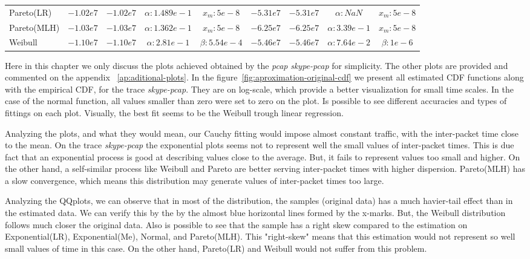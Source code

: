 \begin{table}[h!]
{\begin{tabular}{lcccccccc}
            Pareto(LR)      & $-1.02e7$   & $-1.02e7$  & $\alpha:1.489e-1 $ & $x_m:5e-8 $    
            & $-5.31e7$   & $-5.31e7$  & $\alpha:NaN$ & $x_m:5e-8 $    \\
            Pareto(MLH)     & $-1.03e7$   & $-1.03e7$  & $\alpha:1.362e-1$ & $x_m:5e-8 $    
            & $-6.25e7$   & $-6.25e7$  & $\alpha:3.39e-1$ & $x_m:5e-8 $    \\
            Weibull         & $-1.10e7$   & $-1.10e7$  & $\alpha:2.81e-1$ & $\beta:5.54e-4$  
            & $-5.46e7$   & $-5.46e7$  & $\alpha:7.64e-2$ & $\beta:1e-6$  \\ \hline
        \end{tabular}
    \label{tab:prototype-results}
    }
\end{table}

Here in this chapter we only discuss the plots achieved obtained by the \textit{pcap} \textit{skype-pcap} for simplicity. The other plots are provided and commented on the appendix ~\ref{ap:aditional-plots}. In the figure~\ref{fig:aproximation-original-cdf} we present all estimated CDF functions along with the empirical CDF, for the trace \textit{skype-pcap}. They are on log-scale, which provide a better visualization for small time scales. In the case of the normal function, all values smaller than zero were set to zero on the plot. Is possible to see different accuracies and types of fittings on each plot. Visually, the best fit seems to be the Weibull trough linear regression. 

Analyzing the plots, and what they would mean, our Cauchy fitting would impose almost constant traffic, with the inter-packet time close to the mean. On the trace \textit{skype-pcap} the exponential plots seems not to represent well the small values of inter-packet times. This is due fact that an exponential process is good at describing values close to the average. But, it fails to represent values too small and higher. On the other hand, a self-similar process like Weibull and Pareto are better serving inter-packet times with higher dispersion. Pareto(MLH) has a slow convergence, which means this distribution may generate values of inter-packet times too large. 

Analyzing the QQplots, we can observe that in most of the distribution, the samples (original data) has a much havier-tail effect than in the estimated data. We can verify this by the by the almost blue horizontal lines formed by the x-marks. But, the Weibull distribution follows much closer the original data. Also is possible to see that the sample has a right skew compared to the estimation on Exponential(LR), Exponential(Me), Normal, and Pareto(MLH). This "right-skew" means that this estimation would not represent so well small values of time in this case. On the other hand, Pareto(LR) and Weibull would not suffer from this problem.

